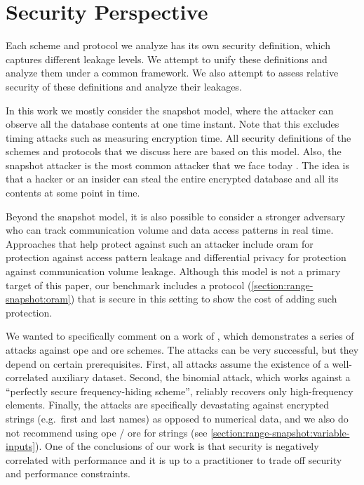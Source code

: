 \section{Security Perspective}\label{section:range-snapshot:security}

	Each scheme and protocol we analyze has its own security definition, which captures different leakage levels.
	We attempt to unify these definitions and analyze them under a common framework.
	We also attempt to assess relative security of these definitions and analyze their leakages.

	In this work we mostly consider the snapshot model, where the attacker can observe all the database contents at one time instant.
	Note that this excludes timing attacks such as measuring encryption time.
	All security definitions of the schemes and protocols that we discuss here are based on this model.
	Also, the snapshot attacker is the most common attacker that we face today \cite{secure-queries-overview}.
	The idea is that a hacker or an insider can steal the entire encrypted database and all its contents at some point in time.

	Beyond the snapshot model, it is also possible to consider a stronger adversary who can track communication volume and data access patterns in real time.
	Approaches that help protect against such an attacker include \acrshort{oram} for protection against access pattern leakage and differential privacy for protection against communication volume leakage.
	Although this model is not a primary target of this paper, our benchmark includes a protocol (\cref{section:range-snapshot:oram}) that is secure in this setting to show the cost of adding such protection.

	We wanted to specifically comment on a work of \textcite{leakage-abuse-grubs-2017}, which demonstrates a series of attacks against \acrshort{ope} and \acrshort{ore} schemes.
	The attacks can be very successful, but they depend on certain prerequisites.
	First, all attacks assume the existence of a well-correlated auxiliary dataset.
	Second, the binomial attack, which works against a ``perfectly secure frequency-hiding scheme'', reliably recovers only high-frequency elements.
	Finally, the attacks are specifically devastating against encrypted strings (e.g.\ first and last names) as opposed to numerical data, and we also do not recommend using \acrshort{ope} / \acrshort{ore} for strings (see \cref{section:range-snapshot:variable-inputs}).
	One of the conclusions of our work is that security is negatively correlated with performance and it is up to a practitioner to trade off security and performance constraints.

